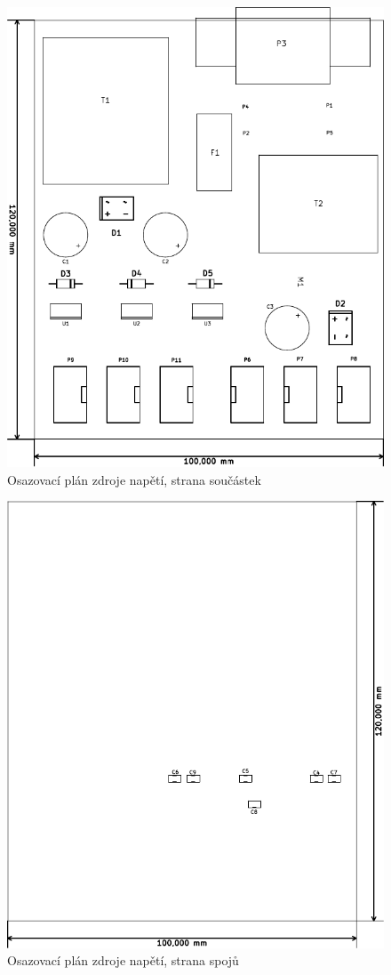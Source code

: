 \begin{figure}[H]
	\centering
	\includegraphics[width=170mm]{img/zdroj/os_f.pdf}
	\caption{Osazovací plán zdroje napětí, strana součástek}    		
\end{figure}

\begin{figure}[H]
	\centering
	\includegraphics[width=170mm]{img/zdroj/os_b.pdf}
	\caption{Osazovací plán zdroje napětí, strana spojů}    		
\end{figure}